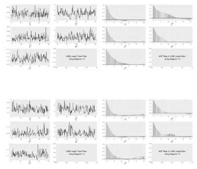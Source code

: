 \begin{figure}[h]
\centering
\includegraphics[width=0.45\textwidth,height=5cm]{Chapters/05MCMCOU/plots/gg1k1chain.pdf}
\includegraphics[width=0.45\textwidth,height=5cm]{Chapters/05MCMCOU/plots/gg1k1acf.pdf}
\includegraphics[width=0.45\textwidth,height=5cm]{Chapters/05MCMCOU/plots/gg1k13chain.pdf}
\includegraphics[width=0.45\textwidth,height=5cm]{Chapters/05MCMCOU/plots/gg1k13acf.pdf}
\end{figure}
